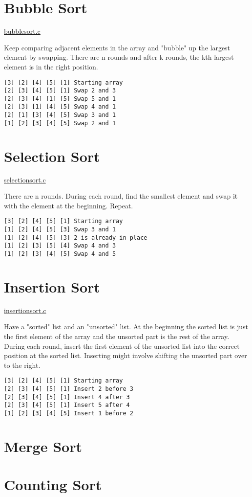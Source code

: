 \documentclass{article}
\begin{document}
\section{Bubble Sort}
\href{algos/bubblesort.c}{bubblesort.c}  \newline

Keep comparing adjacent elements in the array and "bubble" up the largest element by swapping.
There are n rounds and after k rounds, the kth largest element is in the right position.
\begin{lstlisting}
[3] [2] [4] [5] [1] Starting array
[2] [3] [4] [5] [1] Swap 2 and 3
[2] [3] [4] [1] [5] Swap 5 and 1
[2] [3] [1] [4] [5] Swap 4 and 1
[2] [1] [3] [4] [5] Swap 3 and 1
[1] [2] [3] [4] [5] Swap 2 and 1
\end{lstlisting}

\section{Selection Sort}
\href{algos/selectionsort.c}{selectionsort.c}  \newline

There are n rounds. During each round, find the smallest element and swap it with the element at the beginning. Repeat.
\begin{lstlisting}
[3] [2] [4] [5] [1] Starting array
[1] [2] [4] [5] [3] Swap 3 and 1
[1] [2] [4] [5] [3] 2 is already in place
[1] [2] [3] [5] [4] Swap 4 and 3
[1] [2] [3] [4] [5] Swap 4 and 5
\end{lstlisting}

\section{Insertion Sort}
\href{algos/insertionsort.c}{insertionsort.c}  \newline

Have a "sorted" list and an "unsorted" list.
At the beginning the sorted list is just the first element of the array and the unsorted part is the rest of the array.
During each round, insert the first element of the unsorted list into the correct position at the sorted list.
Inserting might involve shifting the unsorted part over to the right.
\begin{lstlisting}
[3] [2] [4] [5] [1] Starting array
[2] [3] [4] [5] [1] Insert 2 before 3
[2] [3] [4] [5] [1] Insert 4 after 3
[2] [3] [4] [5] [1] Insert 5 after 4
[1] [2] [3] [4] [5] Insert 1 before 2
\end{lstlisting}

\section{Merge Sort}
\section{Counting Sort}
\end{document}
